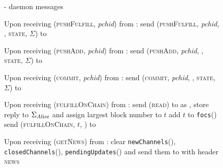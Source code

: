   \begin{figure}[H]
    \begin{systembox}{\fpaynet - daemon messages}
      \begin{algorithmic}[1]
        \State Upon receiving (\textsc{pushFulfill}, \textit{pchid}) from
        \alice:
        \Indent
          \State send (\textsc{pushFulfill}, \textit{pchid}, \alice,
          \textsc{state}, $\Sigma$) to \simulator
        \EndIndent
        \Statex

        \State Upon receiving (\textsc{pushAdd}, \textit{pchid}) from \alice:
        \Indent
          \State send (\textsc{pushAdd}, \textit{pchid}, \alice, \textsc{state},
          $\Sigma$) to \simulator
        \EndIndent
        \Statex

        \State Upon receiving (\textsc{commit}, \textit{pchid}) from \alice:
        \Indent
          \State send (\textsc{commit}, \textit{pchid}, \alice, \textsc{state},
          $\Sigma$) to \simulator
        \EndIndent
        \Statex

        \State Upon receiving (\textsc{fulfillOnChain}) from \alice:
        \Indent
          \State send (\textsc{read}) to \ledger{} as \alice{}, store reply to
          $\Sigma_{\mathit{Alice}}$ and assign largest block number to $t$
          \State add $t$ to \texttt{focs}(\alice)
          \State send (\textsc{fulfillOnChain}, $t$, \alice) to \simulator
        \EndIndent
        \Statex

        \State Upon receiving (\textsc{getNews}) from \alice:
        \Indent
          \State clear \texttt{newChannels}(\alice),
          \texttt{closedChannels}(\alice), \texttt{pendingUpdates}(\alice) and
          send them to \alice with header \textsc{news}
        \EndIndent
      \end{algorithmic}
    \end{systembox}
    \caption{}
    \label{alg:fpaynet:misc}
  \end{figure}
